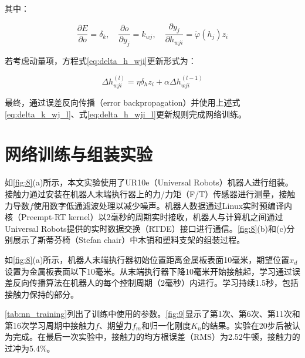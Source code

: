 \documentclass{Diploma}
\begin{document}
其中：

\begin{equation} \label{eq:partial_derivatives_h}
\frac{\partial E}{\partial o} = \delta_k, \quad \frac{\partial o}{\partial y_j} = k_{wj}, \quad \frac{\partial y_j}{\partial h_{wji}} = \dot{\varphi}(h_j) z_i
\end{equation}

若考虑动量项，方程式\eqref{eq:delta_h_wji}更新形式为：

\begin{equation} \label{eq:delta_h_wji_l}
\Delta h_{wji}^{(l)} = \eta \delta_h z_i + \alpha \Delta h_{wji}^{(l-1)}
\end{equation}

最终，通过误差反向传播（error backpropagation）并使用上述式\eqref{eq:delta_k_wj_l}、式\eqref{eq:delta_h_wji_l}更新规则完成网络训练。

\section{网络训练与组装实验}

如\ref{fig:8}(a)所示，本文实验使用了UR10e（Universal Robots）机器人进行组装。接触力通过安装在机器人末端执行器上的力/力矩（F/T）传感器进行测量，接触力导数$\dot{f}$使用数字低通滤波处理以减少噪声。机器人数据通过Linux实时预编译内核（Preempt-RT kernel）以2毫秒的周期实时接收，机器人与计算机之间通过Universal Robots提供的实时数据交换（RTDE）接口进行通信。\ref{fig:8}(b)和(c)分别展示了斯蒂芬椅（Stefan chair）中木销和塑料支架的组装过程。

%

如\ref{fig:8}(a)所示，机器人末端执行器初始位置距离金属板表面10毫米，期望位置$x_d$设置为金属板表面以下10毫米。从末端执行器下降10毫米开始接触起，学习通过误差反向传播算法在机器人的每个控制周期（2毫秒）内进行。学习持续1.5秒，包括接触力保持的部分。

\ref{tab:nn_training}列出了训练中使用的参数。\ref{fig:9}显示了第1次、第6次、第11次和第16次学习周期中接触力$f$、期望力$f_m$和归一化刚度$K_n$的结果。实验在20步后被认为完成。在最后一次实验中，接触力的均方根误差（RMS）为2.52牛顿，接触力的过冲为5.4\%。

%
\end{document}

